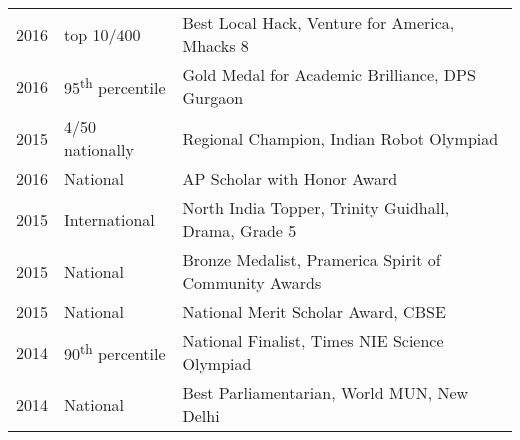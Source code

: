 \documentclass[letterpaper]{deedy-resume} %
\begin{document}
\begin{minipage}[t]{0.66\textwidth}
\begin{tabular}{rll}
2016	 & top 10/400 & Best Local Hack, Venture for America, Mhacks 8\\
2016	 & 95\textsuperscript{th} percentile & Gold Medal for Academic Brilliance, DPS Gurgaon\\
2015	 & 4/50 nationally & Regional Champion, Indian Robot Olympiad\\
2016 	 & National & AP Scholar with Honor Award\\
2015 	 & International & North India Topper, Trinity Guidhall, Drama, Grade 5\\
2015	 & National & Bronze Medalist, Pramerica Spirit of Community Awards\\
2015	 & National & National Merit Scholar Award, CBSE\\
2014 	 & 90\textsuperscript{th} percentile & National Finalist, Times NIE Science Olympiad \\
2014 	 & National & Best Parliamentarian, World MUN, New Delhi\\
\end{tabular}

\sectionspace %


\end{minipage} %








\end{document}
